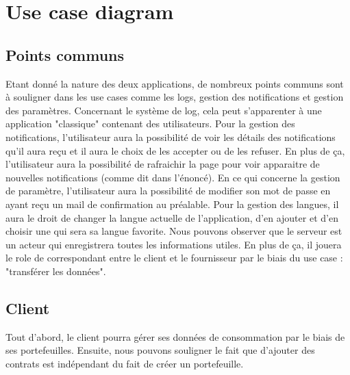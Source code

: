 \section{Use case diagram}
\subsection{Points communs}
	Etant donné la nature des deux applications, de nombreux points communs sont à souligner dans les use cases comme les logs, gestion des notifications et gestion des paramètres.
\newline
\newline
	Concernant le système de log, cela peut s'apparenter à une application "classique" contenant des utilisateurs.
\newline
\newline
	Pour la gestion des notifications, l'utilisateur aura la possibilité de voir les détails des notifications qu'il aura reçu et il aura le choix de les accepter ou de les refuser. En plus de ça, l'utilisateur aura la possibilité de rafraichir la page pour voir apparaitre de nouvelles notifications (comme dit dans l'énoncé).
\newline
\newline
	En ce qui concerne la gestion de paramètre, l'utilisateur aura la possibilité de modifier son mot de passe en ayant reçu un mail de confirmation au préalable. Pour la gestion des langues, il aura le droit de changer la langue actuelle de l'application, d'en ajouter et d'en choisir une qui sera sa langue favorite.
\newline
\newline
	Nous pouvons observer que le serveur est un acteur qui enregistrera toutes les informations utiles. En plus de ça, il jouera le role de correspondant entre le client et le fournisseur par le biais du use case : "transférer les données".

\newpage

\subsection{Client}
	Tout d'abord, le client pourra gérer ses données de consommation par le biais de ses portefeuilles.
\newline
\newline
	Ensuite, nous pouvons souligner le fait que d'ajouter des contrats est indépendant du fait de créer un portefeuille. 

